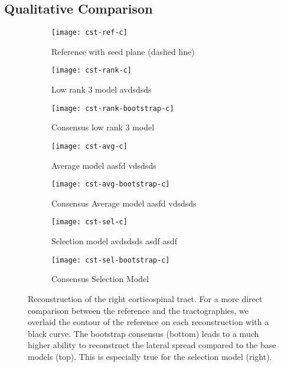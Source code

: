 \subsection{Qualitative Comparison}
\begin{figure*}[t]
	\centering
	\begin{minipage}{0.19\linewidth}
\begin{subfigure}[b]{\linewidth}
		\texttt{[image: cst-ref-c]}
		\caption{Reference with seed plane (dashed line)}
	\end{subfigure}
\end{minipage}
\hfil
	\begin{minipage}{0.19\linewidth}
		\begin{subfigure}[b]{\linewidth}
		\texttt{[image: cst-rank-c]}
		\caption{Low rank 3 model {\color{white} avdsdsds} }
	\end{subfigure}
	\begin{subfigure}[b]{\linewidth}
		\texttt{[image: cst-rank-bootstrap-c]}
		\caption{Consensus low rank 3 model}
\end{subfigure} 
	\end{minipage} \hfil
	\begin{minipage}{0.19\linewidth}
	\begin{subfigure}[b]{\linewidth}
		\texttt{[image: cst-avg-c]}
		\caption{Average model {\color{white} aasfd vdsdsds}}
	\end{subfigure}
	\begin{subfigure}[b]{\linewidth}
		\texttt{[image: cst-avg-bootstrap-c]}
		\caption{Consensus Average model{\color{white} aasfd vdsdsds}}
\end{subfigure} 
	\end{minipage} \hfil 
	\begin{minipage}{0.19\linewidth} 
	\begin{subfigure}[b]{\linewidth}
		\texttt{[image: cst-sel-c]}
		\caption{Selection model {\color{white} avdsdsds asdf asdf}}
	\end{subfigure}
	\begin{subfigure}[b]{\linewidth}
		\texttt{[image: cst-sel-bootstrap-c]}
		\caption{Consensus Selection Model}
\end{subfigure} 
	\end{minipage}
\caption{Reconstruction of the right corticospinal tract. For a more direct comparison
	between the reference and the tractographies, we overlaid the contour of the reference on each reconstruction with a black
	curve. The bootstrap consensus (bottom) leads to a much higher ability
to reconstruct the lateral spread compared to the base models (top). This is
especially true for the selection model (right).  }
	\label{fig:CST}
\end{figure*}

